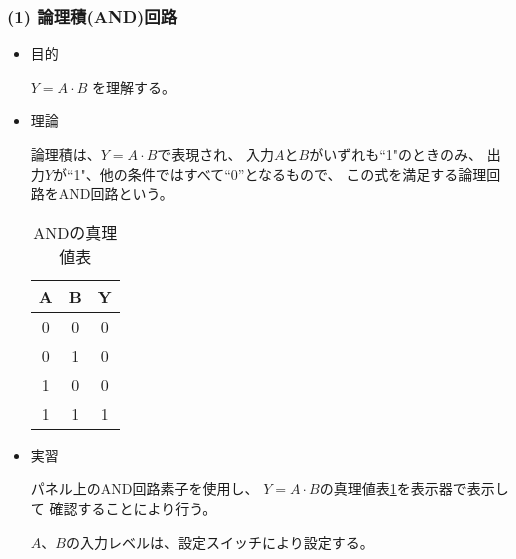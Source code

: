 \documentclass[12pt]{jarticle}
\begin{document}
\subsubsection*{(1) 論理積(AND)回路}
\begin{itemize}
    \item 目的

          $Y=A\cdot B$ を理解する。

    \item 理論

          論理積は、$Y=A\cdot B$で表現され、
          入力$A$と$B$がいずれも``1"のときのみ、
          出力$Y$が``1"、他の条件ではすべて``0''となるもので、
          この式を満足する論理回路をAND回路という。

          \clearpage

          \begin{table}[h]
              \caption{ANDの真理値表}
              \begin{center}
                  \begin{tabular}{|c|c|c|}
                      \hline
                      A & B & Y \\
                      \hline
                      0 & 0 & 0 \\
                      \hline
                      0 & 1 & 0 \\
                      \hline
                      1 & 0 & 0 \\
                      \hline
                      1 & 1 & 1 \\
                      \hline
                  \end{tabular}
              \end{center}
              \label{table1}
          \end{table}

    \item 実習

          パネル上のAND回路素子を使用し、
          $Y=A\cdot B$の真理値表\ref{table1}を表示器で表示して
          確認することにより行う。

          $A$、$B$の入力レベルは、設定スイッチにより設定する。
\end{itemize}
\end{document}
